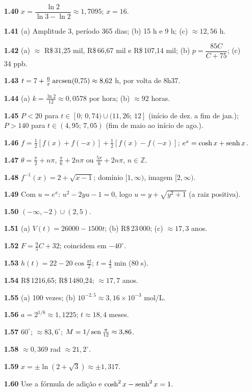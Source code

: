{\begin{multicols}{2}
\begin{itemize}[leftmargin=2.7em,labelsep=0.5em,itemsep=1pt]
\item[\textbf{1.40}] $x=\dfrac{\ln2}{\ln3-\ln2}\approx1{,}7095$; $x=16$.
\item[\textbf{1.41}] (a) Amplitude 3, período 365 dias; (b) 15 h e 9 h; (c) $\approx12{,}56$ h.
\item[\textbf{1.42}] (a) $\approx$ R\$\,31,25 mil, R\$\,66,67 mil e R\$\,107,14 mil;
(b) $p=\dfrac{85C}{C+75}$; (c) 34 ppb.
\item[\textbf{1.43}] $t=7+\frac6\pi\operatorname{arcsen}(0{,}75)\approx8{,}62$ h, por volta de 8h37.
\item[\textbf{1.44}] (a) $k=\frac{\ln2}{12}\approx0{,}0578$ por hora; (b) $\approx92$ horas.
\item[\textbf{1.45}] $P<20$ para $t\in[0;\,0{,}74)\cup(11{,}26;\,12]$ (início de dez. a fim de jan.);
$P>140$ para $t\in(4{,}95;\,7{,}05)$ (fim de maio ao início de ago.).
\item[\textbf{1.46}] $f=\tfrac12[f(x)+f(-x)]+\tfrac12[f(x)-f(-x)]$; $e^x=\cosh x+\operatorname{senh} x$.
\item[\textbf{1.47}] $\theta=\tfrac\pi2+n\pi$, $\tfrac\pi6+2n\pi$ ou $\tfrac{5\pi}6+2n\pi$, $n\in\mathbb Z$.
\item[\textbf{1.48}] $f^{-1}(x)=2+\sqrt{x-1}$; domínio $[1,\infty)$, imagem $[2,\infty)$.
\item[\textbf{1.49}] Com $u=e^x$: $u^2-2yu-1=0$, logo $u=y+\sqrt{y^2+1}$ (a raiz positiva).
\item[\textbf{1.50}] $(-\infty,-2)\cup(2,5)$.
\item[\textbf{1.51}] (a) $V(t)=26000-1500t$; (b) R\$\,23\,000; (c) $\approx17{,}3$ anos.
\item[\textbf{1.52}] $F=\tfrac95C+32$; coincidem em $-40^\circ$.
\item[\textbf{1.53}] $h(t)=22-20\cos\tfrac{\pi t}2$; $t=\tfrac43$ min (80 s).
\item[\textbf{1.54}] R\$\,1216{,}65; R\$\,1480{,}24; $\approx17{,}7$ anos.
\item[\textbf{1.55}] (a) 100 vezes; (b) $10^{-2{,}5}\approx3{,}16\times10^{-3}$ mol/L.
\item[\textbf{1.56}] $a=2^{1/6}\approx1{,}1225$; $t\approx18{,}4$ meses.
\item[\textbf{1.57}] $60^\circ$; $\approx83{,}6^\circ$; $M=1/\operatorname{sen}\tfrac\pi{12}\approx3{,}86$.
\item[\textbf{1.58}] $\approx0{,}369$ rad $\approx21{,}2^\circ$.
\item[\textbf{1.59}] $x=\pm\ln(2+\sqrt3)\approx\pm1{,}317$.
\item[\textbf{1.60}] Use a fórmula de adição e $\cosh^2x-\operatorname{senh}^2x=1$.

\end{itemize}
\end{multicols}}
